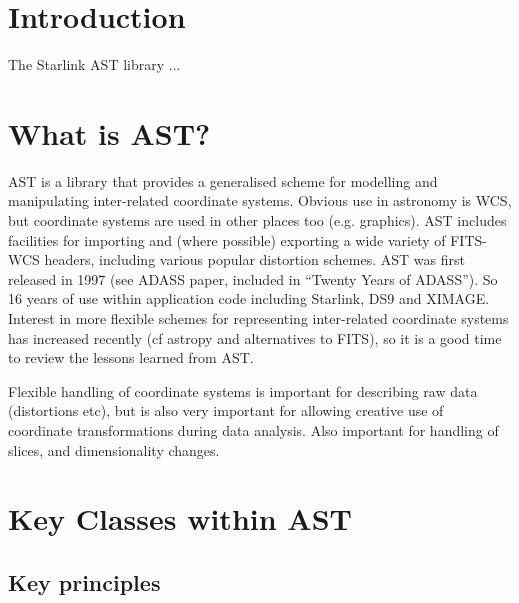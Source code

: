 \documentclass[final,authoryear,5p,times,twocolumn]{elsarticle}
\begin{document}
\newcommand{\mnras}{Mon Not R Astron Soc}
\newcommand{\aap}{Astron Astrophys}
\newcommand{\aaps}{Astron Astrophys Supp}
\newcommand{\pasp}{Pub Astron Soc Pacific}
\newcommand{\apj}{Astrophys J}
\newcommand{\apjs}{Astrophys J Supp}
\newcommand{\qjras}{Quart J R Astron Soc}
\newcommand{\an}{Astron.\ Nach.}
\newcommand{\ijimw}{Int.\ J.\ Infrared \& Millimeter Waves}
\newcommand{\procspie}{Proc.\ SPIE}
\newcommand{\aspconf}{ASP Conf. Ser.}

\newcommand{\ascl}[1]{\href{http://www.ascl.net/#1}{ascl:#1}}

\section{Introduction}
\label{sec:intro}
The Starlink AST library \citep{SUN211} ...


\section{What is AST?}

AST is a library that provides a generalised scheme for modelling and
manipulating inter-related coordinate systems. Obvious use in
astronomy is WCS, but coordinate systems are used in other places too
(e.g. graphics).  AST includes facilities for importing and (where
possible) exporting a wide variety of FITS-WCS headers, including
various popular distortion schemes. AST was first released in 1997
(see ADASS paper, included in “Twenty Years of ADASS”). So 16 years of
use within application code including Starlink, DS9 and
XIMAGE. Interest in more flexible schemes for representing
inter-related coordinate systems has increased recently (cf astropy
and alternatives to FITS), so it is a good time to review the lessons
learned from AST.

Flexible handling of coordinate systems is important for describing
raw data (distortions etc), but is also very important for allowing
creative use of coordinate transformations during data analysis. Also
important for handling of slices, and dimensionality changes.

\section{Key Classes within AST}

\subsection{Key principles}
\end{document}
